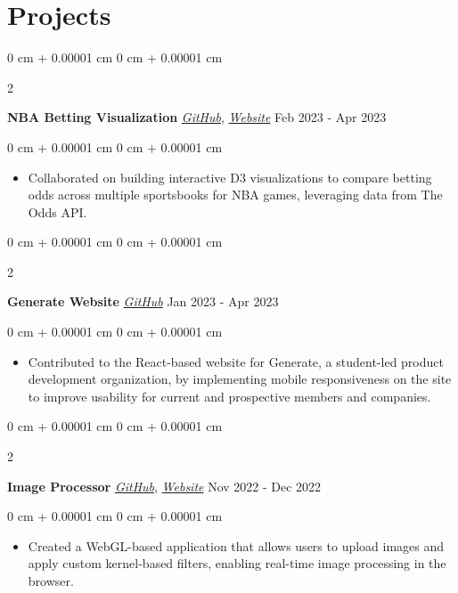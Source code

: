 \documentclass[10pt, letterpaper]{article}
\newenvironment{highlights}{
    \begin{itemize}[
        topsep=0.10 cm,
        parsep=0.10 cm,
        partopsep=0pt,
        itemsep=0pt,
        leftmargin=0 cm + 10pt
    ]
}{
    \end{itemize}
} %
\newenvironment{onecolentry}{
    \begin{adjustwidth}{
        0 cm + 0.00001 cm
    }{
        0 cm + 0.00001 cm
    }
}{
    \end{adjustwidth}
} %
\newenvironment{twocolentry}[2][]{
    \onecolentry
    \def\secondColumn{#2}
    \setcolumnwidth{\fill, 4.5 cm}
    \begin{paracol}{2}
}{
    \switchcolumn \raggedleft \secondColumn
    \end{paracol}
    \endonecolentry
} %
\begin{document}
    \section{Projects}
        \begin{twocolentry}{
            Feb 2023 - Apr 2023
        }
        \textbf{NBA Betting Visualization} \href{https://github.com/GenerateNU/website}{\textit{GitHub}}, \href{https://ds4200-s23-class.github.io/project-zach-george-filip-travis/}{\textit{Website}}\end{twocolentry}
        \vspace{0.10 cm}
        \begin{onecolentry}
            \begin{highlights}
                \item Collaborated on building interactive D3 visualizations to compare betting odds across multiple sportsbooks for NBA games, leveraging data from The Odds API.
            \end{highlights}
        \end{onecolentry}
        \vspace{0.2 cm}
        \begin{twocolentry}{
            Jan 2023 - Apr 2023
        }
        \textbf{Generate Website} \href{https://github.com/GenerateNU/website}{\textit{GitHub}}\end{twocolentry}
        \vspace{0.10 cm}
        \begin{onecolentry}
            \begin{highlights}
                \item Contributed to the React-based website for Generate, a student-led product development organization, by implementing mobile responsiveness on the site to improve usability for current and prospective members and companies.
            \end{highlights}
        \end{onecolentry}
        \vspace{0.2 cm}
        \begin{twocolentry}{
            Nov 2022 - Dec 2022
        }
        \textbf{Image Processor} \href{https://github.com/zachnorman02/webgl-image-processor}{\textit{GitHub}}, \href{https://zachnorman02.github.io/webgl-image-processor/}{\textit{Website}}\end{twocolentry}
        \vspace{0.10 cm}
        \begin{onecolentry}
            \begin{highlights}
                \item  Created a WebGL-based application that allows users to upload images and apply custom kernel-based filters, enabling real-time image processing in the browser.
            \end{highlights}
        \end{onecolentry}
        \vspace{0.2 cm}
\end{document}
